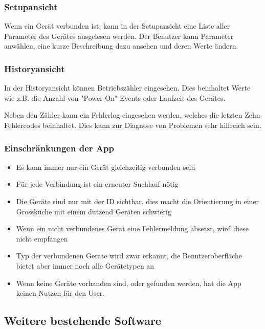 \subsubsection{Setupansicht}
\label{subsubsec:Setupansicht}
Wenn ein Gerät verbunden ist, kann in der Setupansicht eine Liste aller Parameter des Gerätes ausgelesen werden. Der Benutzer kann Parameter anwählen, eine kurze Beschreibung dazu ansehen und deren Werte ändern.

\subsubsection{Historyansicht}
\label{subsubsec:Ansichten}
In der Historyansicht können Betriebszähler eingesehen. Dies beinhaltet Werte wie z.B. die Anzahl von "Power-On" Events oder Laufzeit des Gerätes.

Neben den Zähler kann ein Fehlerlog eingesehen werden, welches die letzten Zehn Fehlercodes beinhaltet. Dies kann zur Diagnose von Problemen sehr hilfreich sein.

\subsubsection{Einschränkungen der App}
\label{subsubsec:Einschränkungen der App}
\begin{itemize}
\item Es kann immer nur ein Gerät gleichzeitig verbunden sein
\item Für jede Verbindung ist ein erneuter Suchlauf nötig
\item Die Geräte sind nur mit der ID sichtbar, dies macht die Orientierung in einer Grossküche mit einem dutzend Geräten schwierig
\item Wenn ein nicht verbundenes Gerät eine Fehlermeldung absetzt, wird diese nicht empfangen
\item Typ der verbundenen Geräte wird zwar erkannt, die Benutzeroberfläche bietet aber immer noch alle Gerätetypen an
\item Wenn keine Geräte vorhanden sind, oder gefunden werden, hat die App keinen Nutzen für den User.
\end{itemize}

\subsection{Weitere bestehende Software}
\label{subsec:Weitere bestehende Software}
